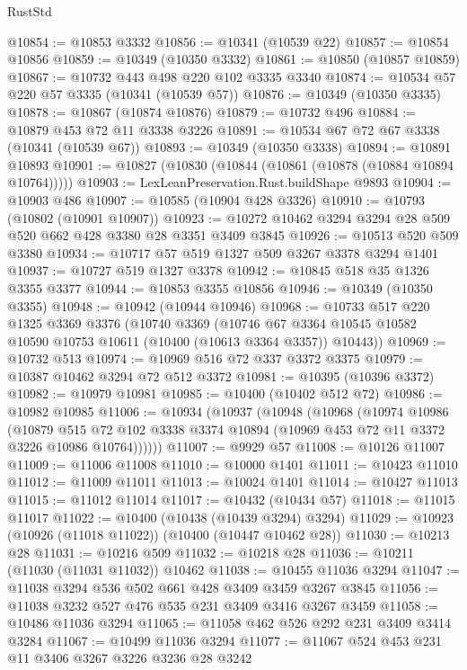 \begin{lexlean}{RustStd}
\begin{coremodule}
@10854 := @10853 @3332
@10856 := @10341 (@10539 @22)
@10857 := @10854 @10856
@10859 := @10349 (@10350 @3332)
@10861 := @10850 (@10857 @10859)
@10867 := @10732 @443 @498 @220 @102 @3335 @3340
@10874 := @10534 @57 @220 @57 @3335 (@10341 (@10539 @57))
@10876 := @10349 (@10350 @3335)
@10878 := @10867 (@10874 @10876)
@10879 := @10732 @496
@10884 := @10879 @453 @72 @11 @3338 @3226
@10891 := @10534 @67 @72 @67 @3338 (@10341 (@10539 @67))
@10893 := @10349 (@10350 @3338)
@10894 := @10891 @10893
@10901 := @10827 (@10830 (@10844 (@10861 (@10878 (@10884 @10894 @10764)))))
@10903 := LexLeanPreservation.Rust.buildShape @9893
@10904 := @10903 @486
@10907 := @10585 (@10904 @428 @3326)
@10910 := @10793 (@10802 (@10901 @10907))
@10923 := @10272 @10462 @3294 @3294 @28 @509 @520 @662 @428 @3380 @28 @3351 @3409 @3845
@10926 := @10513 @520 @509 @3380
@10934 := @10717 @57 @519 @1327 @509 @3267 @3378 @3294 @1401
@10937 := @10727 @519 @1327 @3378
@10942 := @10845 @518 @35 @1326 @3355 @3377
@10944 := @10853 @3355 @10856
@10946 := @10349 (@10350 @3355)
@10948 := @10942 (@10944 @10946)
@10968 := @10733
    @517
    @220
    @1325
    @3369
    @3376
    (@10740
      @3369
      (@10746 @67 @3364 @10545 @10582 @10590 @10753 @10611 (@10400 (@10613 @3364 @3357)) @10443))
@10969 := @10732 @513
@10974 := @10969 @516 @72 @337 @3372 @3375
@10979 := @10387 @10462 @3294 @72 @512 @3372
@10981 := @10395 (@10396 @3372)
@10982 := @10979 @10981
@10985 := @10400 (@10402 @512 @72)
@10986 := @10982 @10985
@11006 := @10934
    (@10937
      (@10948
        (@10968
          (@10974
            @10986
            (@10879
              @515
              @72
              @102
              @3338
              @3374
              @10894
              (@10969 @453 @72 @11 @3372 @3226 @10986 @10764))))))
@11007 := @9929 @57
@11008 := @10126 @11007
@11009 := @11006 @11008
@11010 := @10000 @1401
@11011 := @10423 @11010
@11012 := @11009 @11011
@11013 := @10024 @1401
@11014 := @10427 @11013
@11015 := @11012 @11014
@11017 := @10432 (@10434 @57)
@11018 := @11015 @11017
@11022 := @10400 (@10438 (@10439 @3294) @3294)
@11029 := @10923 (@10926 (@11018 @11022)) (@10400 (@10447 @10462 @28))
@11030 := @10213 @28
@11031 := @10216 @509
@11032 := @10218 @28
@11036 := @10211 (@11030 (@11031 @11032)) @10462
@11038 := @10455 @11036 @3294
@11047 := @11038 @3294 @536 @502 @661 @428 @3409 @3459 @3267 @3845
@11056 := @11038 @3232 @527 @476 @535 @231 @3409 @3416 @3267 @3459
@11058 := @10486 @11036 @3294
@11065 := @11058 @462 @526 @292 @231 @3409 @3414 @3284
@11067 := @10499 @11036 @3294
@11077 := @11067 @524 @453 @231 @11 @3406 @3267 @3226 @3236 @28 @3242

\end{coremodule}
\end{lexlean}
